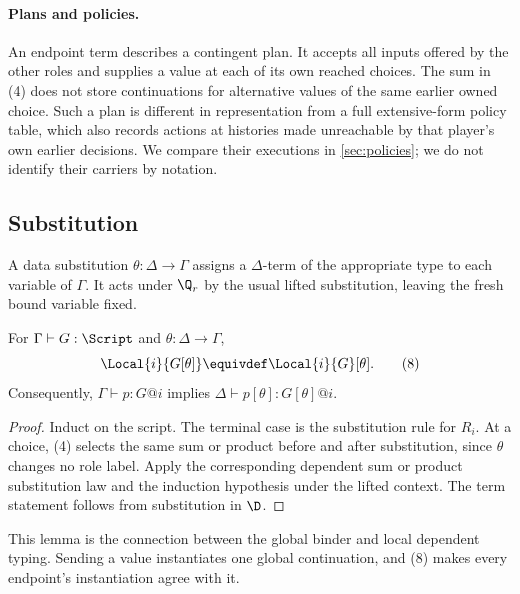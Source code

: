 \paragraph{Plans and policies.}
An endpoint term describes a contingent plan. It accepts all inputs offered by
the other roles and supplies a value at each of its own reached choices. The
sum in (4) does not store continuations for alternative values of the same
earlier owned choice. Such a plan is different in representation from a full
extensive-form policy table, which also records actions at histories made
unreachable by that player's own earlier decisions. We compare their
executions in \cref{sec:policies}; we do not identify their carriers by
notation.

\subsection{Substitution}

A data substitution $\theta:\Delta\to\Gamma$ assigns a $\Delta$-term of the
appropriate type to each variable of $\Gamma$. It acts under $\Q_r$ by the
usual lifted substitution, leaving the fresh bound variable fixed.

\begin{lemma}
\label{lem:substitution}
For $\Gamma\vdash G:\Script$ and $\theta:\Delta\to\Gamma$,
\[
 \Local{i}{G[\theta]}\equivdef\Local{i}{G}[\theta].
 \tag{8}
\]
Consequently, $\Gamma\vdash p:G@i$ implies
$\Delta\vdash p[\theta]:G[\theta]@i$.
\end{lemma}
\begin{proof}
Induct on the script. The terminal case is the substitution rule for $R_i$.
At a choice, (4) selects the same sum or product before and after
substitution, since $\theta$ changes no role label. Apply the corresponding
dependent sum or product substitution law and the induction hypothesis under
the lifted context. The term statement follows from substitution in $\D$.
\end{proof}

This lemma is the connection between the global binder and local dependent
typing. Sending a value instantiates one global continuation, and (8) makes
every endpoint's instantiation agree with it.
